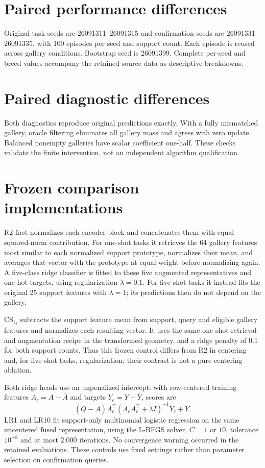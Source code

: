 \appendix
\section{Paired performance differences}\label{app:paired}

Original task seeds are 26091311--26091315 and confirmation seeds are 26091331--26091335, with 100 episodes per seed and support count. Each episode is reused across gallery conditions. Bootstrap seed is 26091399. Complete per-seed and breed values accompany the retained source data as descriptive breakdowns.

\section{Paired diagnostic differences}\label{app:interventions}

Both diagnostics reproduce original predictions exactly. With a fully mismatched gallery, oracle filtering eliminates all gallery mass and agrees with zero update. Balanced nonempty galleries have scalar coefficient one-half. These checks validate the finite intervention, not an independent algorithm qualification.

\section{Frozen comparison implementations}
R2 first normalizes each encoder block and concatenates them with equal squared-norm contribution. For one-shot tasks it retrieves the 64 gallery features most similar to each normalized support prototype, normalizes their mean, and averages that vector with the prototype at equal weight before normalizing again. A five-class ridge classifier is fitted to these five augmented representatives and one-hot targets, using regularization $\lambda=0.1$. For five-shot tasks it instead fits the original 25 support features with $\lambda=1$; its predictions then do not depend on the gallery.

CS$_{\ell_2}$ subtracts the support feature mean from support, query and eligible gallery features and normalizes each resulting vector. It uses the same one-shot retrieval and augmentation recipe in the transformed geometry, and a ridge penalty of $0.1$ for both support counts. Thus this frozen control differs from R2 in centering and, for five-shot tasks, regularization; their contrast is not a pure centering ablation.

Both ridge heads use an unpenalized intercept: with row-centered training features $A_c=A-\bar A$ and targets $Y_c=Y-\bar Y$, scores are
\[
 (Q-\bar A)A_c^\top(A_cA_c^\top+\lambda I)^{-1}Y_c+\bar Y.
\]
LR1 and LR10 fit support-only multinomial logistic regression on the same uncentered fused representation, using the L-BFGS solver, $C=1$ or $10$, tolerance $10^{-8}$ and at most 2,000 iterations. No convergence warning occurred in the retained evaluations. These controls use fixed settings rather than parameter selection on confirmation queries.

